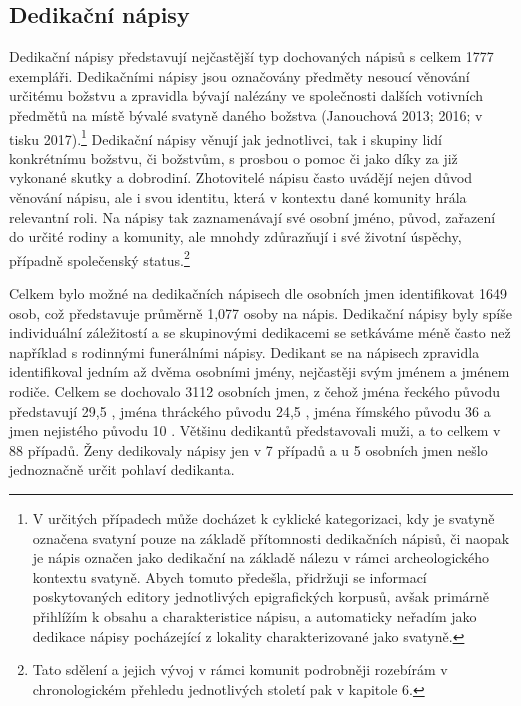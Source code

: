 
\subsection[dedikační-nápisy]{Dedikační nápisy}

Dedikační nápisy představují nejčastější typ dochovaných nápisů s celkem 1777 exempláři. Dedikačními nápisy jsou označovány předměty nesoucí věnování určitému božstvu a zpravidla bývají nalézány ve společnosti dalších votivních předmětů na místě bývalé svatyně daného božstva (Janouchová 2013; 2016; v tisku 2017).\footnote{V určitých případech může docházet k cyklické kategorizaci, kdy je svatyně označena svatyní pouze na základě přítomnosti dedikačních nápisů, či naopak je nápis označen jako dedikační na základě nálezu v rámci archeologického kontextu svatyně. Abych tomuto předešla, přidržuji se informací poskytovaných editory jednotlivých epigrafických korpusů, avšak primárně přihlížím k obsahu a charakteristice nápisu, a automaticky neřadím jako dedikace nápisy pocházející z lokality charakterizované jako svatyně.} Dedikační nápisy věnují jak jednotlivci, tak i skupiny lidí konkrétnímu božstvu, či božstvům, s prosbou o pomoc či jako díky za již vykonané skutky a dobrodiní. Zhotovitelé nápisu často uvádějí nejen důvod věnování nápisu, ale i svou identitu, která v kontextu dané komunity hrála relevantní roli. Na nápisy tak zaznamenávají své osobní jméno, původ, zařazení do určité rodiny a komunity, ale mnohdy zdůrazňují i své životní úspěchy, případně společenský status.\footnote{Tato sdělení a jejich vývoj v rámci komunit podrobněji rozebírám v chronologickém přehledu jednotlivých století pak v kapitole 6.}

Celkem bylo možné na dedikačních nápisech dle osobních jmen identifikovat 1649 osob, což představuje průměrně 1,077 osoby na nápis. Dedikační nápisy byly spíše individuální záležitostí a se skupinovými dedikacemi se setkáváme méně často než například s rodinnými funerálními nápisy. Dedikant se na nápisech zpravidla identifikoval jedním až dvěma osobními jmény, nejčastěji svým jménem a jménem rodiče. Celkem se dochovalo 3112 osobních jmen, z čehož jména řeckého původu představují 29,5 , jména thráckého původu 24,5 , jména římského původu 36  a jmen nejistého původu 10 . Většinu dedikantů představovali muži, a to celkem v 88  případů. Ženy dedikovaly nápisy jen v 7  případů a u 5  osobních jmen nešlo jednoznačně určit pohlaví dedikanta.


